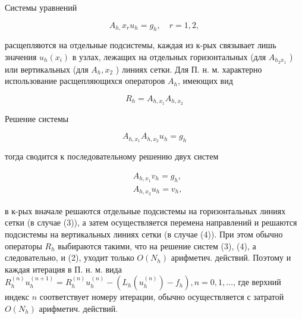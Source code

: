 \documentclass[10pt]{article}
\begin{document}
Системы уравнений



\[

A_{h,} x_{r} u_{h}=g_{h}, \quad r=1,2,

\]



расщепляются на отдельные подсистемы, каждая из к-рых связывает лишь значения $u_{h}\left(x_{i}\right)$ в узлах, лежащих на отдельных горизонтальных (для $A_{h_{2} x_{1}}$ ) или вертикальных (для $A_{h}, x_{2}$ ) линиях сетки. Для П. н. м. характерно использование расщепляющихся операторов $A_{h}$, имеющих вид



\[

R_{h}=A_{h, x_{1}} A_{h, x_{2}}

\]



Решение системы



\[

A_{h, x_{1}} A_{h, x_{2}} u_{h}=g_{h}

\]



тогда сводится к последовательному решению двух систем



\[

\begin{aligned}

& A_{h, x_{1}} v_{h}=g_{h}, \\

& A_{h, x_{2}} u_{h}=v_{h},

\end{aligned}

\]



в к-рых вначале решаются отдельные подсистемы на горизонтальных линиях сетки (в случае (3)), а затем осуществляется перемена направлений и решаются подсистемы на вертикальных линиях сетки (в случае (4)). При этом обычно операторы $R_{h}$ выбираются такими, что на решение систем (3), (4), а следовательно, и (2), уходит только $O\left(N_{h}\right)$ арифметич. действий. Поэтому и каждая итерация в П. н. м. вида $R_{h}^{(n)} u_{h}^{(n+1)}=R_{h}^{(n)} u_{h}^{(n)}-\left(L_{h}\left(u_{h}^{(n)}\right)-f_{h}\right), n=0,1, \ldots$, где верхний индекс $n$ соответствует номеру итерации, обычно осуществляется с затратой $O\left(N_{h}\right)$ арифметич. действий.
\end{document}

